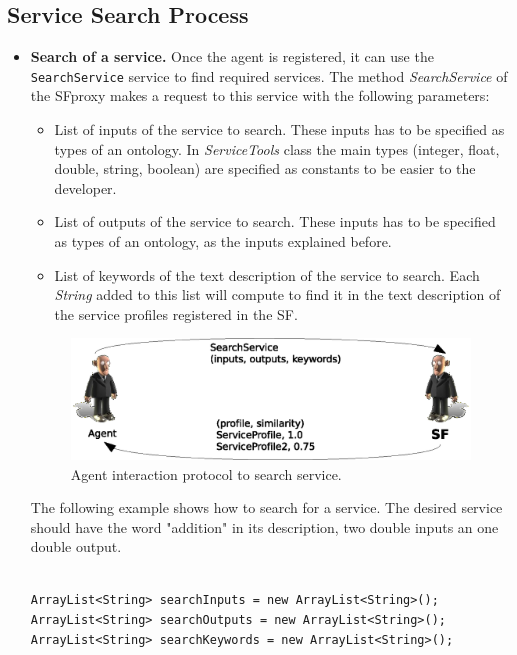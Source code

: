 \subsection{Service Search Process}
\begin{itemize}
\item \textbf{Search of a service.} Once the agent is registered, it can use the \lstinline|SearchService| service to find required services. The method \textit{SearchService} of the SFproxy makes a request to this service with the following parameters:
  \begin{itemize}
   \item List of inputs of the service to search. These inputs has to be specified as types of an ontology. In \textit{ServiceTools} class the main types (integer, float, double, string, boolean) are specified as constants to be easier to the developer.
   \item List of outputs of the service to search. These inputs has to be specified as types of an ontology, as the inputs explained before.
   \item List of keywords of the text description of the service to search. Each \textit{String} added to this list will compute to find it in the text description of the service profiles registered in the SF.
  \end{itemize}

\begin{figure}[h!t]
	\centering
	\includegraphics[width=.8\textwidth]{Thomas/images/searchService}
	\caption{Agent interaction protocol to search service.}
\end{figure}


The following example shows how to search for a service. The desired service should have the word "addition" in its description, two double inputs an one double output.

\begin{lstlisting}

ArrayList<String> searchInputs = new ArrayList<String>();
ArrayList<String> searchOutputs = new ArrayList<String>();
ArrayList<String> searchKeywords = new ArrayList<String>();


\end{lstlisting}
\end{itemize}
